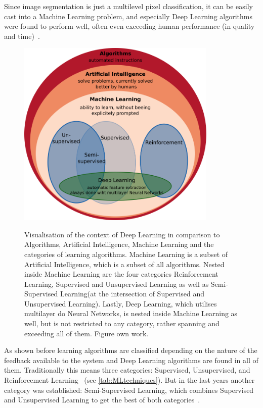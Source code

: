Since image segmentation is just a multilevel pixel classification, it can be easily cast into a Machine Learning problem, and especially Deep Learning algorithms were found to perform well, often even exceeding human performance (in quality and time)~\autocite{Alzubaidi2021}.

\begin{figure}[!htb]
    \centering
    \includegraphics[width=0.85\textwidth]{pictures/contextML}\\
    \caption[Context of Deep Learning]{Visualisation of the context of Deep Learning in comparison to Algorithms, Artificial Intelligence, Machine Learning and the categories of learning algorithms. Machine Learning is a subset of Artificial Intelligence, which is a subset of all algorithms. Nested inside Machine Learning are the four categories Reinforcement Learning, Supervised and Unsupervised Learning as well as Semi-Supervised Learning(at the intersection of Supervised and Unsupervised Learning). Lastly, Deep Learning, which utilises multilayer do Neural Networks, is nested inside Machine Learning as well, but is not restricted to any category, rather spanning and exceeding all of them. Figure own work.}
    \label{fig:MLcontext}
\end{figure}

As shown before learning algorithms are classified depending on the nature of the feedback available to the system and Deep Learning algorithms are found in all of them.
Traditionally this means three categories: Supervised, Unsupervised, and Reinforcement Learning~\autocite{Burkov2019} (see \autoref{tab:MLtechniques}).
But in the last years another category was established: Semi-Super\-vised Learning, which combines Supervised and Unsupervised Learning to get the best of both categories~\autocite{Burkov2019}.

